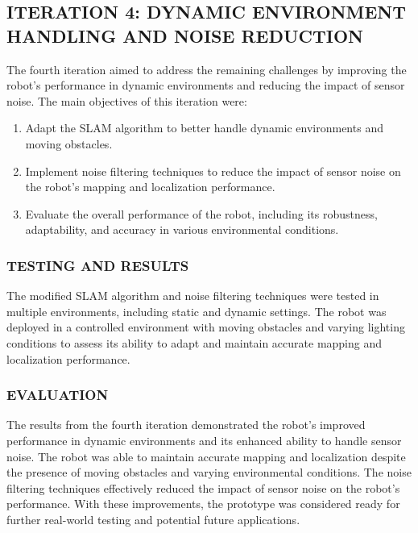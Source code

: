 \documentclass[12pt]{article}
\begin{document}
    \subsection{ITERATION 4: DYNAMIC ENVIRONMENT HANDLING AND NOISE REDUCTION}
    
    The fourth iteration aimed to address the remaining challenges by improving the robot's performance in dynamic environments and reducing the impact of sensor noise. The main objectives of this iteration were:
    
    \begin{enumerate}
        \item Adapt the SLAM algorithm to better handle dynamic environments and moving obstacles.
        \item Implement noise filtering techniques to reduce the impact of sensor noise on the robot's mapping and localization performance.
        \item Evaluate the overall performance of the robot, including its robustness, adaptability, and accuracy in various environmental conditions.
    \end{enumerate}
        
        \subsubsection{TESTING AND RESULTS}
        
        The modified SLAM algorithm and noise filtering techniques were tested in multiple environments, including static and dynamic settings. The robot was deployed in a controlled environment with moving obstacles and varying lighting conditions to assess its ability to adapt and maintain accurate mapping and localization performance.
        
        \subsubsection{EVALUATION}
        
        The results from the fourth iteration demonstrated the robot's improved performance in dynamic environments and its enhanced ability to handle sensor noise. The robot was able to maintain accurate mapping and localization despite the presence of moving obstacles and varying environmental conditions. The noise filtering techniques effectively reduced the impact of sensor noise on the robot's performance. With these improvements, the prototype was considered ready for further real-world testing and potential future applications.



\end{document}

